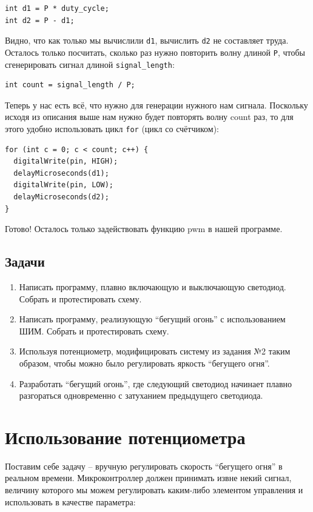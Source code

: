 \documentclass[a4paper,twoside]{book}
\begin{document}
\begin{verbatim}
int d1 = P * duty_cycle;
int d2 = P - d1;
\end{verbatim}

Видно, что как только мы вычислили \texttt{d1}, вычислить \texttt{d2} не
составляет труда. Осталось только посчитать, сколько раз нужно повторить волну
длиной \texttt{P}, чтобы сгенерировать сигнал длиной \texttt{signal\_length}:

\begin{verbatim}
int count = signal_length / P;
\end{verbatim}

Теперь у нас есть всё, что нужно для генерации нужного нам сигнала. Поскольку
исходя из описания выше нам нужно будет повторять волну count раз, то для этого
удобно использовать цикл \texttt{for} (цикл со счётчиком):

\begin{verbatim}
for (int c = 0; c < count; c++) {
  digitalWrite(pin, HIGH);
  delayMicroseconds(d1);
  digitalWrite(pin, LOW);
  delayMicroseconds(d2);
}
\end{verbatim}

Готово! Осталось только задействовать функцию pwm в нашей программе.

\subsection{Задачи}

\begin{enumerate}
\item Написать программу, плавно включающую и выключающую светодиод. Собрать и
  протестировать схему. 
\item Написать программу, реализующую ``бегущий огонь'' с использованием ШИМ.
  Собрать и протестировать схему.
\item Используя потенциометр, модифицировать систему из задания №2 таким
  образом, чтобы можно было регулировать яркость ``бегущего огня''.
\item Разработать ``бегущий огонь'', где следующий светодиод начинает плавно
  разгораться одновременно с затуханием предыдущего светодиода.
\end{enumerate}

\section{Использование потенциометра}

Поставим себе задачу -- вручную регулировать скорость ``бегущего огня'' в
реальном времени. Микроконтроллер должен принимать извне некий сигнал, величину
которого мы можем регулировать каким-либо элементом управления и использовать в
качестве параметра:
\end{document}
